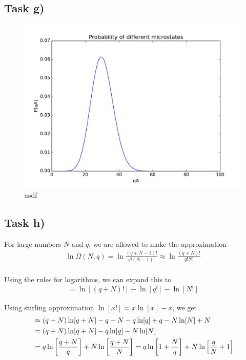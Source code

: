 \documentclass[12p,a4paper]{article}
\begin{document}
\subsection*{Task g)}

\begin{figure}[H]
    \centering
    \includegraphics[scale=0.6]{task_g.pdf}
    \caption{asdf}
    \label{asdf}
\end{figure}


\subsection*{Task h)}
For large numbers $N$ and $q$, we are allowed to make the approximation
\begin{align*}
	\ln \Omega(N,q) = \ln \frac{(q+N-1)!}{q!(N-1)!} \approx \ln \frac{(q+N)!}{q!N!} \\
\end{align*}

Using the rules for logarithms, we can expand this to
\begin{align*}
    = \ln[(q+N)!] - \ln[q!] - \ln[N!]
\end{align*}

Using stirling approximation $\ln[x!] \approx x\ln[x] - x$, we get
\begin{align*}
    &\approx (q+N) \ln[q+N] -q -N -q\ln[q] +q -N\ln[N] + N \\
    &= (q+N)\ln[q+N] - q\ln[q] - N\ln[N] \\
    &= q\ln\qty[\frac{q+N}{q}] + N\ln\qty[\frac{q+N}{N}]
    = q\ln\qty[{1+\frac{N}{q}}] + N\ln\qty[\frac{q}{N}+1]
\end{align*}
\end{document}
